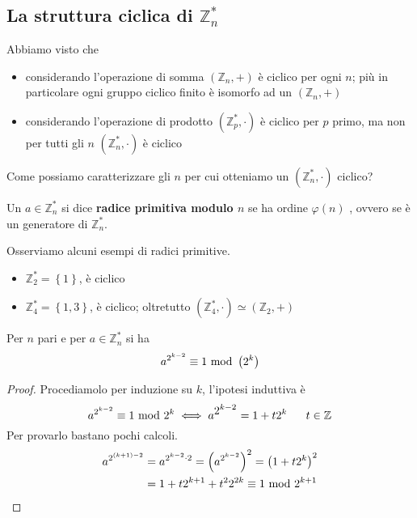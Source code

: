 \subsection{La struttura ciclica di $\mathbb{Z}_n^*$}
Abbiamo visto che 
\begin{itemize}
	\item considerando l'operazione di somma $\left(\mathbb{Z}_n,+\right)$ è ciclico per ogni $n$; più in particolare ogni gruppo ciclico finito è isomorfo ad un $\left(\mathbb{Z}_n,+\right)$
	\item considerando l'operazione di prodotto $\left(\mathbb{Z}_p^*,\cdot\right)$ è ciclico per $p$ primo, ma non per tutti gli $n$ $\left(\mathbb{Z}_n^*,\cdot\right)$ è ciclico
\end{itemize}
Come possiamo caratterizzare gli $n$ per cui otteniamo un $\left(\mathbb{Z}_n^*,\cdot\right)$ ciclico?
\begin{definizione}
	Un $a\in\mathbb{Z}_n^*$ si dice \textbf{radice primitiva modulo $n$} se ha ordine $\varphi(n)$
	, ovvero se è un generatore di $\mathbb{Z}_n^*$.
\end{definizione}
\begin{esempio}
	Osserviamo alcuni esempi di radici primitive.
	\begin{itemize}
		\item $\mathbb{Z}_2^*=\left\{1\right\}$, è ciclico
		\item $\mathbb{Z}_4^*=\left\{1,3\right\}$, è ciclico; oltretutto $\left(\mathbb{Z}_4^*,\cdot\right)\simeq\left(\mathbb{Z}_{2},+\right)$
	\end{itemize}
\end{esempio}
\begin{proposizione}
	Per $n$ pari e per $a\in\mathbb{Z}_n^*$ si ha 
	\begin{equation*}
	a^{2^{k-2}}\equiv1\ \mathrm{mod}\ \left(2^k\right)
	\end{equation*} 
\end{proposizione}
\begin{proof}
	Procediamolo per induzione su $k$, l'ipotesi induttiva è 
	\begin{equation*}
	a^{2^{k-2}}\equiv1\ \mathrm{mod}\ 2^k \iff a^{\displaystyle2^{k-2}}=1+t2^k \ \ \ \ \ t \in \mathbb{Z}
	\end{equation*}
	Per provarlo bastano pochi calcoli.
	\begin{align*}
	a^{2^{(k+1)-2}}&=a^{2^{k-2}\cdot2}=\left(a^{2^{k-2}}\right)^2=\left(1+t2^k\right)^2\\
	&= 1+t2^{k+1}+t^22^{2k}\equiv1\ \mathrm{mod}\ 2^{k+1}
	\end{align*}
\end{proof}
